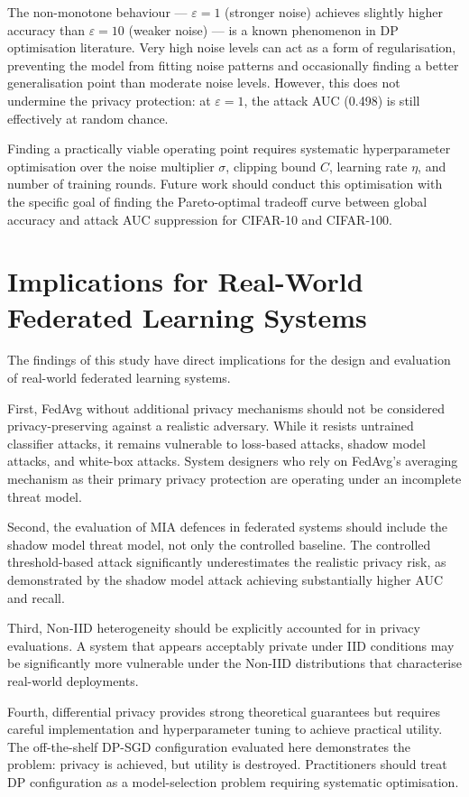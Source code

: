 \documentclass[12pt, a4paper]{report}
\begin{document}
The non-monotone behaviour --- $\varepsilon = 1$ (stronger noise) achieves slightly
higher accuracy than $\varepsilon = 10$ (weaker noise) --- is a known phenomenon
in DP optimisation literature. Very high noise levels can act as a form of
regularisation, preventing the model from fitting noise patterns and occasionally
finding a better generalisation point than moderate noise levels. However, this
does not undermine the privacy protection: at $\varepsilon = 1$, the attack AUC
(0.498) is still effectively at random chance.

Finding a practically viable operating point requires systematic hyperparameter
optimisation over the noise multiplier $\sigma$, clipping bound $C$, learning
rate $\eta$, and number of training rounds. Future work should conduct this
optimisation with the specific goal of finding the Pareto-optimal tradeoff curve
between global accuracy and attack AUC suppression for CIFAR-10 and CIFAR-100.

\section{Implications for Real-World Federated Learning Systems}

The findings of this study have direct implications for the design and evaluation
of real-world federated learning systems.

First, FedAvg without additional privacy mechanisms should not be considered
privacy-preserving against a realistic adversary. While it resists untrained
classifier attacks, it remains vulnerable to loss-based attacks, shadow model
attacks, and white-box attacks. System designers who rely on FedAvg's averaging
mechanism as their primary privacy protection are operating under an incomplete
threat model.

Second, the evaluation of MIA defences in federated systems should include the
shadow model threat model, not only the controlled baseline. The controlled
threshold-based attack significantly underestimates the
realistic privacy risk, as demonstrated by the shadow model attack achieving
substantially higher AUC and recall.

Third, Non-IID heterogeneity should be explicitly accounted for in privacy
evaluations. A system that appears acceptably private under IID conditions may
be significantly more vulnerable under the Non-IID distributions that characterise
real-world deployments.

Fourth, differential privacy provides strong theoretical guarantees but requires
careful implementation and hyperparameter tuning to achieve practical utility.
The off-the-shelf DP-SGD configuration evaluated here demonstrates the problem:
privacy is achieved, but utility is destroyed. Practitioners should treat DP
configuration as a model-selection problem requiring systematic optimisation.
\end{document}

